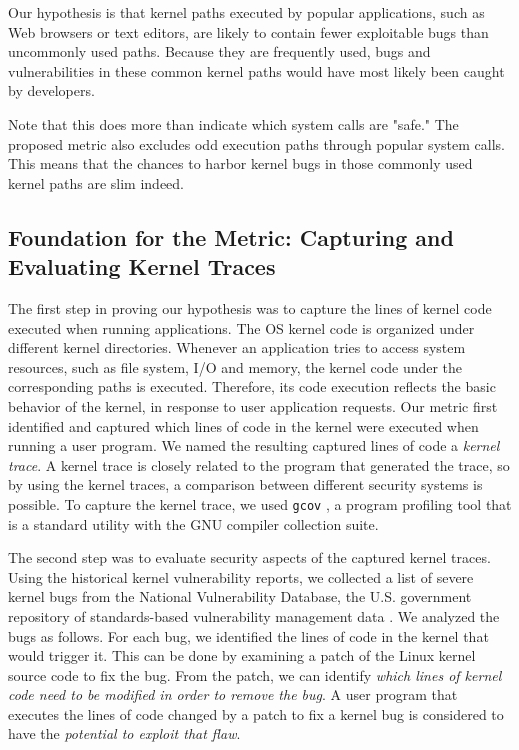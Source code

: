 Our hypothesis is that kernel paths executed by popular applications,
such as Web browsers or text editors, are likely to contain fewer
exploitable bugs
than uncommonly used paths. %
Because they are frequently used, bugs and vulnerabilities in these common kernel paths
would have most likely been caught by developers.

Note that this does more than indicate which system calls are "safe."
The proposed metric also excludes odd execution paths
through popular system calls.
This means that the chances to harbor kernel bugs in those commonly used
kernel paths are slim indeed.

\subsection{Foundation for the Metric: Capturing and Evaluating Kernel Traces}

The first step in proving our hypothesis was to capture the lines of kernel
code executed
when running applications. The OS kernel code is organized under different
kernel directories.
Whenever an application tries to access system resources, such as file
system, I/O and memory, the kernel code under the corresponding paths is executed. Therefore,
its code execution reflects the basic behavior of the kernel, in response
to user application requests.
Our metric first identified and captured which lines of code in the kernel
were executed
when running a user program. We named the resulting captured lines of
code a \textit{kernel trace}.
A kernel trace is closely related to the program that generated the trace, so
by using the kernel traces, a comparison between different
security systems is possible.
To capture the kernel trace, we used \texttt{gcov} \cite{gcov}, a program profiling
tool that is a standard utility with the GNU compiler collection
suite.


The second step was to evaluate security aspects of the captured kernel traces.%
Using the historical kernel vulnerability reports, we collected a list of
severe kernel bugs from
the National Vulnerability Database, the U.S. government repository of
standards-based 
vulnerability management data \cite{NVD}. We analyzed the bugs as
follows. For each bug, we identified the lines of code
in the kernel that would trigger it. This can be done by examining
a patch of the Linux kernel source code to fix the bug. From the patch,
we can identify \textit{which lines of kernel code need to be modified in order to
remove the bug}.
A user program that executes the lines of code changed by a patch to fix a
kernel bug is considered to have the \textit{potential to exploit that flaw}.

